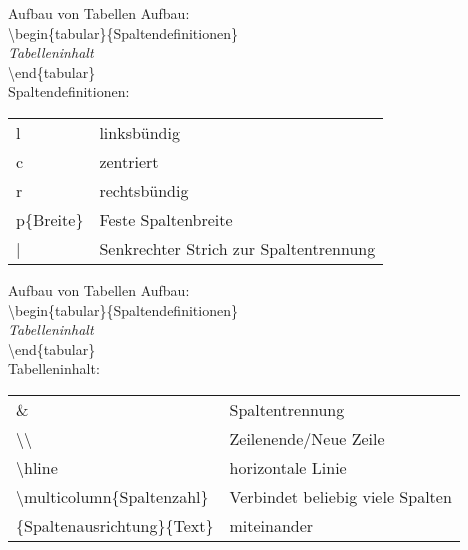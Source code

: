 \begin{frame}{Aufbau von Tabellen}
   Aufbau:\\\vspace{1.5mm}
   \color{cturkis}\textbackslash begin\color{black}\{\color{cpurple}tabular\color{black}\}\{Spaltendefinitionen\}\\
   \textit{Tabelleninhalt}\\
   \color{cturkis}\textbackslash end\color{black}\{\color{cpurple}tabular\color{black}\}\\\vspace{1.5mm}
   Spaltendefinitionen:\\\vspace{1.5mm}
   \begin{tabular}{ll}
        l & linksb\"undig \\
        c & zentriert\\
        r & rechtsb\"undig\\
        p\{Breite\} & Feste Spaltenbreite\\
        \color{cred}|\color{black} & Senkrechter Strich zur Spaltentrennung
   \end{tabular}
\end{frame}
\begin{frame}{Aufbau von Tabellen}
   Aufbau:\\\vspace{1.5mm}
   \color{cturkis}\textbackslash begin\color{black}\{\color{cpurple}tabular\color{black}\}\{Spaltendefinitionen\}\\
   \textit{Tabelleninhalt}\\
   \color{cturkis}\textbackslash end\color{black}\{\color{cpurple}tabular\color{black}\}\\\vspace{1.5mm}
   Tabelleninhalt:\\\vspace{1.5mm}
   \begin{tabular}{ll}
        \color{cred}\&\color{black} & Spaltentrennung\\
        \color{cred}\textbackslash\textbackslash\color{black} & Zeilenende/Neue Zeile\\
        \color{cred}\textbackslash hline\color{black} & horizontale Linie\\
        \color{cturkis}\textbackslash multicolumn\color{black}\{Spaltenzahl\} & Verbindet beliebig viele Spalten\\\{Spaltenausrichtung\}\{Text\}&miteinander
   \end{tabular}
\end{frame}
